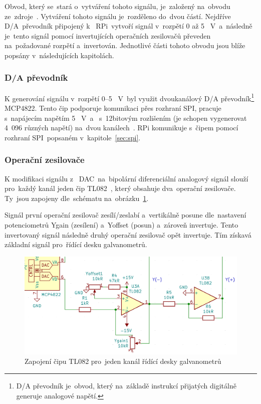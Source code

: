 Obvod, který se~stará o~vytváření tohoto signálu, je~založený na~obvodu ze~zdroje~\cite{lasershow-with-real-galvos}.
Vytváření tohoto signálu je~rozděleno do~dvou částí. Nejdříve D/A~převodník připojený k ~RPi~vytvoří signál v~rozpětí 0 až 5 ~V~a~následně je~tento signál pomocí invertujících operačních zesilovačů převeden na~požadované rozpětí a~invertován.
Jednotlivé části tohoto obvodu jsou blíže popsány v~následujících kapitolách.

\subsubsection{D/A převodník}
K generování signálu v~rozpětí 0--5 ~V~byl využit dvoukanálový D/A převodník\footnote{D/A převodník je~obvod, který na~základě instrukcí přijatých digitálně generuje analogové napětí.} MCP4822.
Tento čip podporuje komunikaci přes rozhraní SPI, pracuje s~napájecím napětím 5 ~V~a ~s~12bitovým rozlišením (je schopen vygenerovat 4~096 různých napětí) na~dvou kanálech~\cite{mcp4822-dsh}.
RPi komunikuje s~čipem pomocí rozhraní SPI~popsaném v~kapitole~\ref{sec:spi}.

\subsubsection{Operační zesilovače}
K modifikaci signálu z ~DAC~na~bipolární diferenciální analogový signál slouží pro~každý kanál jeden čip TL082~\cite{tl082-dsh}, který obsahuje dva~operační zesilovače. Ty~jsou zapojeny dle~schématu na~obrázku~\ref{fig:ilda_amps-scheme}.

Signál první operační zesilovač zesílí/zeslabí a~vertikálně posune dle~nastavení potenciometrů Ygain (zesílení) a~Yoffset (posun) a~zároveň invertuje. Tento invertovaný signál následně druhý operační zesilovač opět invertuje. Tím získavá základní signál pro~řídící desku galvanometrů.

\begin{figure}[htb]
  \centering
  \includegraphics[width=1\textwidth]{img/ilda_amps.png}
  \caption{\label{fig:ilda_amps-scheme} Zapojení čipu TL082 pro~jeden kanál řídící desky galvanometrů}
\end{figure}

